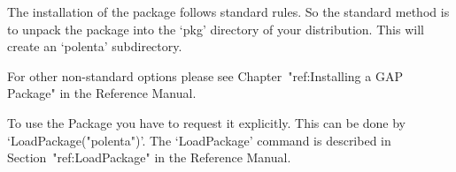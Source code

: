 
\null

The installation of the {\Polenta} package follows standard {\GAP} rules.
So the standard method is to unpack	 the package into the `pkg'
directory  of your {\GAP} distribution.  This will create an `polenta'
subdirectory. 

For other non-standard options please see  Chapter~"ref:Installing a
GAP Package" in the {\GAP} Reference Manual.


\null

To use the {\Polenta} Package you have to request it explicitly. 
This  can be 
done by `LoadPackage("polenta")'.
The `LoadPackage' command is described in Section~"ref:LoadPackage"
in the {\GAP} Reference Manual.



